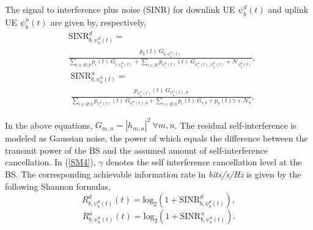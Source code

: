 \documentclass[journal]{IEEEtran}
\begin{document}
The signal to interference plus noise (SINR) for downlink UE $\psi_b^d(t)$ and uplink UE $\psi_b^u(t)$ are given by, respectively, 
\begin{equation}\label{SM3}
\begin{split}
&\text{SINR}_{b,\psi_b^d(t)}^d = \\
 &\frac{p_b(t)~G_{b,\psi_b^d(t)}}{ \sum\limits_{i \in \Pi\setminus b} p_i(t)~G_{i,\psi_b^d(t)} + \sum\limits_{i \in \Pi} p_{\psi_i^u(t)}(t)~G_{\psi_i^u(t),\psi_b^d(t)} + \mathcal{N}_{\psi_b^d(t)} },
\end{split}
\end{equation}
\begin{equation}\label{SM4}
\begin{split}
&\text{SINR}_{b,\psi_b^u(t)}^u = \\
&\frac{p_{\psi_b^u(t)}(t)~G_{\psi_b^u(t),b}}{\sum\limits_{i \in \Pi \setminus b} p_{\psi_i^u(t)}(t)~G_{\psi_i^u(t),b} + \sum\limits_{i\in \Pi\setminus b} p_i(t)~G_{i,b} +  p_b(t) \gamma + \mathcal{N}_{b}}.
\end{split}
\end{equation}

In the above equations, $G_{m,n} = |h_{m,n}|^2~\forall m,n$. The residual self-interference is modeled as Gaussian noise, the power of which equals the difference between the transmit power of the BS and the assumed amount of self-interference cancellation. In (\ref{SM4}), $\gamma$ denotes the self interference cancellation level at the BS. The corresponding achievable information rate in \textit{bits/s/Hz} is given by the following Shannon formulas, 
\begin{equation}\label{SM5}
R_{b, \psi_b^d(t)}^d(t) =  \mathrm{log_2}(1+{\text{SINR}}_{b,\psi_b^d(t)}^d),
\end{equation}
\begin{equation}\label{SM6}
R_{b,\psi_b^u(t)}^u(t) = \mathrm{log_2}(1+{\text{SINR}}_{b,\psi_b^u(t)}^u).
\end{equation}
\end{document}
